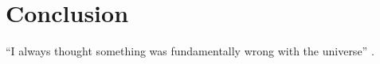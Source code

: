 \section{Conclusion}
``I always thought something was fundamentally wrong with the universe'' \citep{adams1995hitchhiker}.